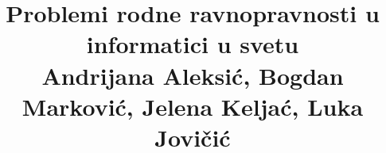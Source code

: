 \documentclass[a4paper]{report}
\newcommand{\odgovor}[1]{\textcolor{blue}{#1}}
\begin{document}
\title{Problemi rodne ravnopravnosti u informatici u svetu\\ \small{Andrijana Aleksić, Bogdan Marković, Jelena Keljać, Luka Jovičić}}

\maketitle

\tableofcontents







\end{document}
